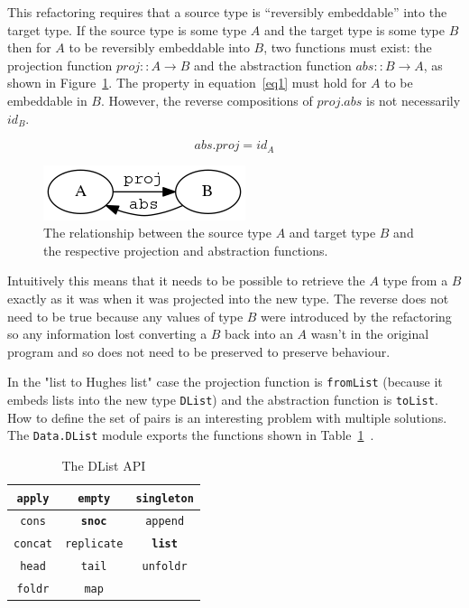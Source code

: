 This refactoring requires that a source type is ``reversibly embeddable'' into the target type. If the source type is some type $A$ and the target type is some type $B$ then for $A$ to be reversibly embeddable into $B$, two functions must exist: the projection function $proj :: A \rightarrow B$ and the abstraction function $abs :: B \rightarrow A$, as shown in Figure~\ref{galois}. The property in equation~\ref{eq1} must hold for $A$ to be embeddable in $B$. However, the reverse compositions of $proj . abs$ is not necessarily $id_B$.   

\begin{figure}[t]
\begin{equation}\label{eq1}
abs . proj = id_A
\end{equation}
\end{figure}

\begin{figure}[h]
	\begin{center}
		\includegraphics[scale=.5]{graphVis/Chapter3/galoisConn.png}
	\end{center}
	\caption{The relationship between the source type $A$ and target type $B$ and the respective projection and abstraction functions.}
	\label{galois}
\end{figure}

Intuitively this means that it needs to be possible to retrieve the $A$ type from a $B$ exactly as it was when it was projected into the new type. The reverse does not need to be true because any values of type $B$ were introduced by the refactoring so any information lost converting a $B$ back into an $A$ wasn't in the original program and so does not need to be preserved to preserve behaviour.

In the "list to Hughes list" case the projection function is \texttt{fromList} (because it embeds lists into the new type \texttt{DList}) and the abstraction function is \texttt{toList}. How to define the set of pairs is an interesting problem with multiple solutions. The \texttt{Data.DList} module exports the  functions shown in Table~\ref{dlistApi}~\citep{dlist}.


\begin{table}
\begin{center}
\begin{tabular}{| c | c | c |}
  \hline
  \texttt{apply} & \texttt{empty} & \texttt{singleton}\\
  \hline
  \texttt{cons} & \textbf{\texttt{snoc}} & \texttt{append} \\
  \hline
  \texttt{concat} & \texttt{replicate} & \textbf{\texttt{list}}\\ 
  \hline	
  \texttt{head} & \texttt{tail} & \texttt{unfoldr}\\ 
  \hline  
  \texttt{foldr} & \texttt{map} & \\
  \hline
\end{tabular}
\end{center}
\caption{The DList API}
\label{dlistApi}
\end{table}


